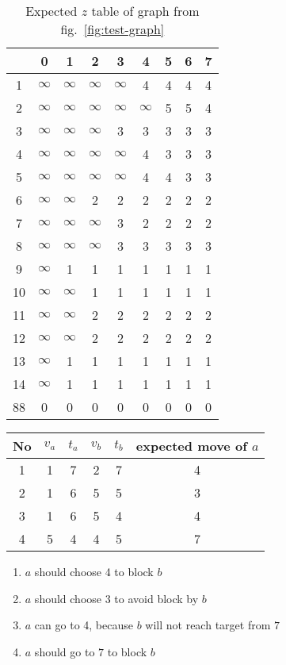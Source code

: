 \documentclass[12pt]{article}
\begin{document}
\begin{table}[H]\centering
    \begin{tabular}{|c|cccccccc|}
        \hline
           & 0        & 1        & 2        & 3        & 4        & 5 & 6 & 7 \\ \hline
        1  & $\infty$ & $\infty$ & $\infty$ & $\infty$ & 4        & 4 & 4 & 4 \\
        2  & $\infty$ & $\infty$ & $\infty$ & $\infty$ & $\infty$ & 5 & 5 & 4 \\
        3  & $\infty$ & $\infty$ & $\infty$ & 3        & 3        & 3 & 3 & 3 \\
        4  & $\infty$ & $\infty$ & $\infty$ & $\infty$ & 4        & 3 & 3 & 3 \\
        5  & $\infty$ & $\infty$ & $\infty$ & $\infty$ & 4        & 4 & 3 & 3 \\
        6  & $\infty$ & $\infty$ & 2        & 2        & 2        & 2 & 2 & 2 \\
        7  & $\infty$ & $\infty$ & $\infty$ & 3        & 2        & 2 & 2 & 2 \\
        8  & $\infty$ & $\infty$ & $\infty$ & 3        & 3        & 3 & 3 & 3 \\
        9  & $\infty$ & 1        & 1        & 1        & 1        & 1 & 1 & 1 \\
        10 & $\infty$ & $\infty$ & 1        & 1        & 1        & 1 & 1 & 1 \\
        11 & $\infty$ & $\infty$ & 2        & 2        & 2        & 2 & 2 & 2 \\
        12 & $\infty$ & $\infty$ & 2        & 2        & 2        & 2 & 2 & 2 \\
        13 & $\infty$ & 1        & 1        & 1        & 1        & 1 & 1 & 1 \\
        14 & $\infty$ & 1        & 1        & 1        & 1        & 1 & 1 & 1 \\
        88 & 0        & 0        & 0        & 0        & 0        & 0 & 0 & 0 \\
        \hline
    \end{tabular}
    \caption{Expected $z$ table of graph from fig.~\ref*{fig:test-graph}}
\end{table}

\begin{table}[H]\centering
    \begin{tabular}{c|cccc|c}
        \toprule
        No & $v_a$ & $t_a$ & $v_b$ & $t_b$ & expected move of $a$ \\ \midrule
        1  & 1     & 7     & 2     & 7     & 4                    \\
        2  & 1     & 6     & 5     & 5     & 3                    \\
        3  & 1     & 6     & 5     & 4     & 4                    \\
        4  & 5     & 4     & 4     & 5     & 7                    \\
        \bottomrule
    \end{tabular}
\end{table}

\begin{enumerate}
    \item $a$ should choose 4 to block $b$
    \item $a$ should choose 3 to avoid block by $b$
    \item $a$ can go to 4, because $b$ will not reach target from $7$
    \item $a$ should go to $7$ to block $b$
\end{enumerate}
\end{document}
